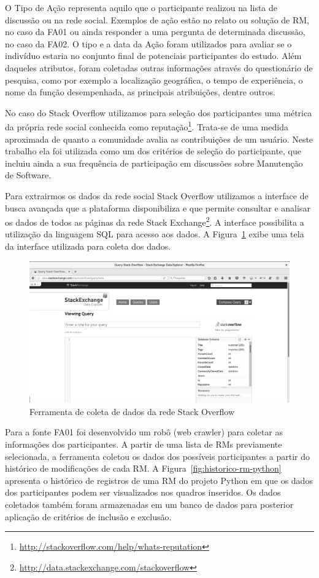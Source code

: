 O Tipo de Ação representa aquilo que o participante realizou na lista de
discussão ou na rede social. Exemplos de ação estão no relato ou solução de RM,
no caso da FA01 ou ainda responder a uma pergunta de determinada discussão, no
caso da FA02. O tipo e a data da Ação foram utilizados para avaliar se o
indivíduo estaria no conjunto final de potenciais participantes do estudo. Além
daqueles atributos, foram coletadas outras informações através do questionário
de pesquisa, como por exemplo a localização geográfica, o tempo de experiência,
o nome da função desempenhada, as principais atribuições, dentre outros.

No caso do Stack Overflow utilizamos para seleção dos participantes uma métrica
da própria rede social conhecida como
reputação\footnote{\url{http://stackoverflow.com/help/whats-reputation}}.
Trata-se de uma medida aproximada de quanto a comunidade avalia as
contribuições de um usuário. Neste trabalho ela foi utilizada como um dos
critérios de seleção do participante, que incluiu ainda a sua frequência de
participação em discussões sobre Manutenção de Software.

Para extrairmos os dados da rede social Stack Overflow utilizamos a interface
de busca avançada que a plataforma disponibiliza e que permite consultar e
analisar os dados de todos as páginas da rede Stack
Exchange\footnote{\url{http://data.stackexchange.com/stackoverflow}}. A
interface possibilita a utilização da linguagem SQL para acesso aos dados. A
Figura~\ref{fig:stack-exchange} exibe uma tela da interface utilizada para
coleta dos dados.

\begin{figure}[htpb]
	\centering
	\includegraphics[width=0.7\linewidth]{./chapter-pesquisa-com-profissionais/img/stack-exchange.png}
	\caption{Ferramenta de coleta de dados da rede Stack Overflow}\label{fig:stack-exchange}
\end{figure}

Para a fonte FA01 foi desenvolvido um robô (web crawler) para coletar as
informações dos participantes. A partir de uma lista de RMs previamente
selecionada, a ferramenta coletou os dados dos possíveis participantes a partir
do histórico de modificações de cada RM\@. A
Figura~\ref{fig:historico-rm-python} apresenta o histórico de registros de uma
RM do projeto Python em que os dados dos participantes podem ser visualizados
nos quadros inseridos. Os dados coletados também foram armazenadas em um banco
de dados para posterior aplicação de critérios de inclusão e exclusão.


